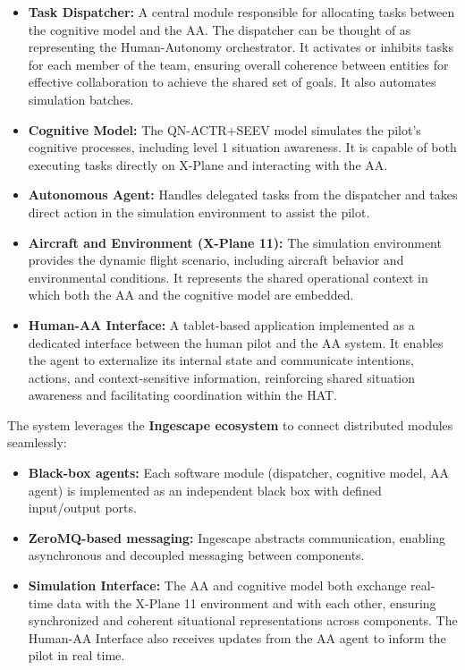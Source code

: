 \documentclass[12pt,a4paper]{article} %
\begin{document}
	\begin{itemize} 
		\item \textbf{Task Dispatcher:} A central module responsible for allocating tasks between the cognitive model and the AA. The dispatcher can be thought of as representing the Human-Autonomy orchestrator. It activates or inhibits tasks for each member of the team, ensuring overall coherence between entities for effective collaboration to achieve the shared set of goals. It also automates simulation batches.
		
		\item \textbf{Cognitive Model:} The QN-ACTR+SEEV model simulates the pilot's cognitive processes, including level 1 situation awareness. It is capable of both executing tasks directly on X-Plane and interacting with the AA.
	
		\item \textbf{Autonomous Agent:} Handles delegated tasks from the dispatcher and takes direct action in the simulation environment to assist the pilot.
	
		\item \textbf{Aircraft and Environment (X-Plane 11):} The simulation environment provides the dynamic flight scenario, including aircraft behavior and environmental conditions. It represents the shared operational context in which both the AA and the cognitive model are embedded.
	
		\item \textbf{Human-AA Interface:} A tablet-based application implemented as a dedicated interface between the human pilot and the AA system. It enables the agent to externalize its internal state and communicate intentions, actions, and context-sensitive information, reinforcing shared situation awareness and facilitating coordination within the HAT.
	\end{itemize}
	
	The system leverages the \textbf{Ingescape ecosystem} to connect distributed modules seamlessly:
	\begin{itemize}
		\item \textbf{Black-box agents:} Each software module (dispatcher, cognitive model, AA agent) is implemented as an independent black box with defined input/output ports.
	
		\item \textbf{ZeroMQ-based messaging:} Ingescape abstracts communication, enabling asynchronous and decoupled messaging between components.
	
		\item \textbf{Simulation Interface:} The AA and cognitive model both exchange real-time data with the X-Plane 11 environment and with each other, ensuring synchronized and coherent situational representations across components. The Human-AA Interface also receives updates from the AA agent to inform the pilot in real time.
	\end{itemize}
	
\end{document}
